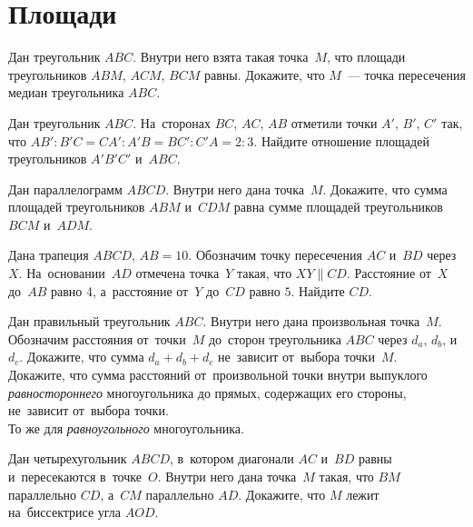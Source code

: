 
\section*{Площади}


\begin{problems}

\item
Дан треугольник $ABC$.
Внутри него взята такая точка~$M$, что площади треугольников
$ABM$, $ACM$, $BCM$ равны.
Докажите, что $M$~--- точка пересечения медиан треугольника $ABC$.

\item
Дан треугольник $ABC$.
На~сторонах $BC$, $AC$, $AB$ отметили точки $A'$, $B'$, $C'$ так, что
$AB' : B'C = CA' : A'B = BC' : C'A = 2 : 3$.
Найдите отношение площадей треугольников $A'B'C'$ и~$ABC$.

\item
Дан параллелограмм $ABCD$.
Внутри него дана точка~$M$.
Докажите, что сумма площадей треугольников $ABM$ и~$CDM$ равна сумме площадей
треугольников $BCM$ и~$ADM$.

\item
Дана трапеция $ABCD$, $AB = 10$.
Обозначим точку пересечения $AC$ и~$BD$ через $X$.
На~основании~$AD$ отмечена точка~$Y$ такая, что $XY \parallel CD$.
Расстояние от~$X$ до~$AB$ равно 4, а~расстояние от~$Y$ до~$CD$ равно $5$.
Найдите $CD$.

\item
\subproblem
Дан правильный треугольник $ABC$.
Внутри него дана произвольная точка~$M$.
Обозначим расстояния от~точки~$M$ до~сторон треугольника $ABC$ через
$d_{a}$, $d_{b}$, и~$d_{c}$.
Докажите, что сумма $d_{a} + d_{b} + d_{c}$ не~зависит от~выбора точки~$M$.
\\
\subproblem
Докажите, что сумма расстояний от~произвольной точки внутри выпуклого
\emph{равностороннего} многоугольника до прямых, содержащих его стороны,
не~зависит от~выбора точки.
\\
\subproblem
То же для \emph{равноугольного} многоугольника.

\item
Дан четырехугольник $ABCD$, в~котором диагонали $AC$ и~$BD$ равны
и~пересекаются в~точке~$O$.
Внутри него дана точка~$M$ такая, что $BM$ параллельно $CD$, а~$CM$
параллельно $AD$.
Докажите, что $M$ лежит на~биссектрисе угла $AOD$.


\end{problems}
